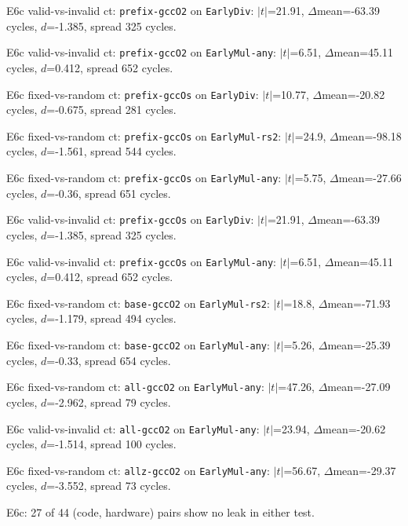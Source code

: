 \item E6c valid-vs-invalid ct: \texttt{prefix-gccO2} on \texttt{EarlyDiv}: $|t|$=21.91, $\Delta$mean=-63.39 cycles, $d$=-1.385, spread 325 cycles.
\item E6c valid-vs-invalid ct: \texttt{prefix-gccO2} on \texttt{EarlyMul-any}: $|t|$=6.51, $\Delta$mean=45.11 cycles, $d$=0.412, spread 652 cycles.
\item E6c fixed-vs-random ct: \texttt{prefix-gccOs} on \texttt{EarlyDiv}: $|t|$=10.77, $\Delta$mean=-20.82 cycles, $d$=-0.675, spread 281 cycles.
\item E6c fixed-vs-random ct: \texttt{prefix-gccOs} on \texttt{EarlyMul-rs2}: $|t|$=24.9, $\Delta$mean=-98.18 cycles, $d$=-1.561, spread 544 cycles.
\item E6c fixed-vs-random ct: \texttt{prefix-gccOs} on \texttt{EarlyMul-any}: $|t|$=5.75, $\Delta$mean=-27.66 cycles, $d$=-0.36, spread 651 cycles.
\item E6c valid-vs-invalid ct: \texttt{prefix-gccOs} on \texttt{EarlyDiv}: $|t|$=21.91, $\Delta$mean=-63.39 cycles, $d$=-1.385, spread 325 cycles.
\item E6c valid-vs-invalid ct: \texttt{prefix-gccOs} on \texttt{EarlyMul-any}: $|t|$=6.51, $\Delta$mean=45.11 cycles, $d$=0.412, spread 652 cycles.
\item E6c fixed-vs-random ct: \texttt{base-gccO2} on \texttt{EarlyMul-rs2}: $|t|$=18.8, $\Delta$mean=-71.93 cycles, $d$=-1.179, spread 494 cycles.
\item E6c fixed-vs-random ct: \texttt{base-gccO2} on \texttt{EarlyMul-any}: $|t|$=5.26, $\Delta$mean=-25.39 cycles, $d$=-0.33, spread 654 cycles.
\item E6c fixed-vs-random ct: \texttt{all-gccO2} on \texttt{EarlyMul-any}: $|t|$=47.26, $\Delta$mean=-27.09 cycles, $d$=-2.962, spread 79 cycles.
\item E6c valid-vs-invalid ct: \texttt{all-gccO2} on \texttt{EarlyMul-any}: $|t|$=23.94, $\Delta$mean=-20.62 cycles, $d$=-1.514, spread 100 cycles.
\item E6c fixed-vs-random ct: \texttt{allz-gccO2} on \texttt{EarlyMul-any}: $|t|$=56.67, $\Delta$mean=-29.37 cycles, $d$=-3.552, spread 73 cycles.
\item E6c: 27 of 44 (code, hardware) pairs show no leak in either test.
